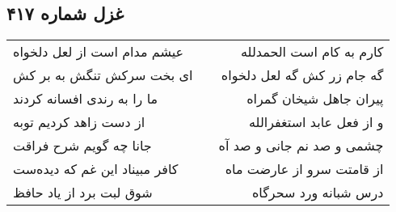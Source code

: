 \begin{center}
\section*{غزل شماره ۴۱۷}
\label{sec:sh417}
\begin{longtable}{l p{0.5cm} r}
عیشم مدام است از لعل دلخواه
&&
کارم به کام است الحمدلله
\\
ای بخت سرکش تنگش به بر کش
&&
گه جام زر کش گه لعل دلخواه
\\
ما را به رندی افسانه کردند
&&
پیران جاهل شیخان گمراه
\\
از دست زاهد کردیم توبه
&&
و از فعل عابد استغفرالله
\\
جانا چه گویم شرح فراقت
&&
چشمی و صد نم جانی و صد آه
\\
کافر مبیناد این غم که دیده‌ست
&&
از قامتت سرو از عارضت ماه
\\
شوق لبت برد از یاد حافظ
&&
درس شبانه ورد سحرگاه
\\
\end{longtable}
\end{center}
